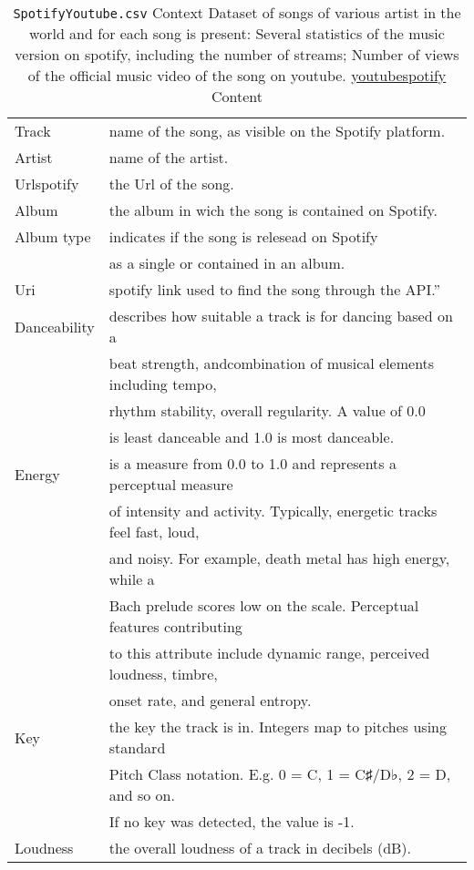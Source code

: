 \documentclass[12pt]{article}
\theoremstyle{remark}
\begin{document}
\begin{table}
	\caption{ \texttt{SpotifyYoutube.csv}
Context
Dataset of songs of various artist in the world and for each song is present:
Several statistics of the music version on spotify, including the number of streams;
Number of views of the official music video of the song on youtube.
\href{ https://www.kaggle.com/datasets/salvatorerastelli/spotify-and-youtube}{youtubespotify} Content
}
	\begin{tabular}{l|l}\hline
Track & name of the song, as visible on the Spotify platform.\\
Artist & name of the artist.\\
Urlspotify & the Url of the song.\\
Album & the album in wich the song is contained on Spotify.\\
Album type & indicates if the song is relesead on Spotify\\
& as a single or contained in an album.\\
Uri & spotify link used to find the song through the API.''\\
Danceability & describes how suitable a track is for dancing based on a \\
&  beat strength, andcombination of musical elements including tempo,  \\
& rhythm stability, overall regularity. A value of 0.0 \\
& is least danceable and 1.0 is most danceable. \\
Energy & is a measure from 0.0 to 1.0 and represents a perceptual measure \\
& of intensity and activity. Typically, energetic tracks feel fast, loud,\\
& and noisy. For example, death metal has high energy, while a \\
& Bach prelude scores low on the scale. Perceptual features contributing\\
& to this attribute include dynamic range, perceived loudness, timbre, \\
& onset rate, and general entropy.\\
Key & the key the track is in. Integers map to pitches using standard \\
& Pitch Class notation. E.g. 0 = C, 1 = C♯/D♭, 2 = D, and so on. \\
& If no key was detected, the value is -1.\\
Loudness & the overall loudness of a track in decibels (dB).\\

\end{tabular}
\end{table}
\end{document}
